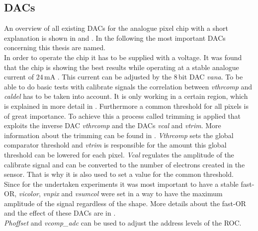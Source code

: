 \documentclass[british,11pt,a4paper]{memoir}
\begin{document}
\subsection{\acs{DAC}s}\label{sdacs}
An overview of all existing \ac{DAC}s for the analogue pixel chip with a short explanation is shown in  and . In the following the most important \ac{DAC}s concerning this thesis are named.\\
In order to operate the chip it has to be supplied with a voltage. It was found that the chip is showing the best results while operating at a stable analogue current of $24\,$mA \cite{dambach}. This current can be adjusted by the $8\,$bit \ac{DAC} \textit{vana}. To be able to do basic tests with calibrate signals the correlation between \textit{vthrcomp} and \textit{caldel} has to be taken into account. It is only working in a certain region, which is explained in more detail in . Furthermore a common threshold for all pixels is of great importance. To achieve this a process called trimming is applied that exploits the inverse \ac{DAC} \textit{vthrcomp} and the \ac{DAC}s \textit{vcal} and \textit{vtrim}. More information about the trimming can be found in . \textit{Vthrcomp} sets the global comparator threshold and \textit{vtrim} is responsible for the amount this global threshold can be lowered for each pixel. \textit{Vcal} regulates the amplitude of the calibrate signal and can be converted to the number of electrons created in the sensor. That is why it is also used to set a value for the common threshold.\\
Since for the undertaken experiments it was most important to have a stable fast-OR, \textit{vicolor}, \textit{vnpix} and \textit{vsumcol} were set in a way to have the maximum amplitude of the signal regardless of the shape. More details about the fast-OR and the effect of these \ac{DAC}s are in .\\
\textit{Phoffset} and \textit{vcomp\_adc} can be used to adjust the address levels of the \ac{ROC}.
\end{document}
